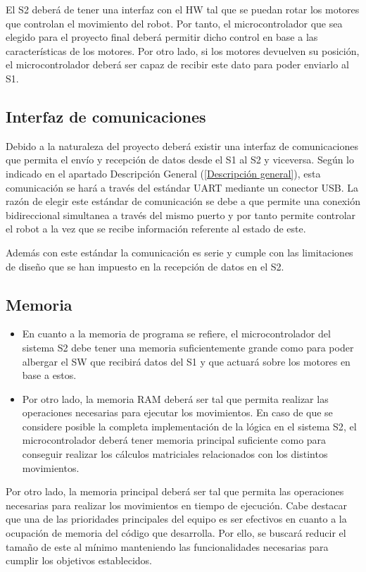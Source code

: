 El \ac{S2} deberá de tener una interfaz con el \ac{HW} tal que se puedan rotar los motores que controlan el movimiento del robot. Por tanto, el microcontrolador que sea elegido para el proyecto final deberá permitir dicho control en base a las características de los motores. Por otro lado, si los motores devuelven su posición, el microcontrolador deberá ser capaz de recibir este dato para poder enviarlo al \ac{S1}.

\subsection{Interfaz de comunicaciones}
Debido a la naturaleza del proyecto deberá existir una interfaz de comunicaciones que permita el envío y recepción de datos desde el \ac{S1} al \ac{S2} y viceversa. Según lo indicado en el apartado Descripción General (\ref{Descripción general}), esta comunicación se hará a través del estándar UART mediante un conector \ac{USB}. La razón de elegir este estándar de comunicación se debe a que permite una conexión bidireccional simultanea a través del mismo puerto y por tanto permite controlar el robot a la vez que se recibe información referente al estado de este. 

Además con este estándar la comunicación es serie y cumple con las limitaciones de diseño que se han impuesto en la recepción de datos en el \ac{S2}.

\subsection{Memoria}

\begin{itemize}

    \item En cuanto a la memoria de programa se refiere, el microcontrolador del sistema \ac{S2} debe tener una memoria suficientemente grande como para poder albergar el \ac{SW} que recibirá datos del \ac{S1} y que actuará sobre los motores en base a estos.
    
    \item Por otro lado, la memoria \ac{RAM} deberá ser tal que permita realizar las operaciones necesarias para ejecutar los movimientos. En caso de que se considere posible la completa implementación de la lógica en el sistema \ac{S2}, el microcontrolador deberá tener memoria principal suficiente como para conseguir realizar los cálculos matriciales relacionados con los distintos movimientos.
    
\end{itemize}
Por otro lado, la memoria principal deberá ser tal que permita las operaciones necesarias para realizar los movimientos en tiempo de ejecución. Cabe destacar que una de las prioridades principales del equipo es ser efectivos en cuanto a la ocupación de memoria del código que desarrolla. Por ello, se buscará reducir el tamaño de este al mínimo manteniendo las funcionalidades necesarias para cumplir los objetivos establecidos.   

